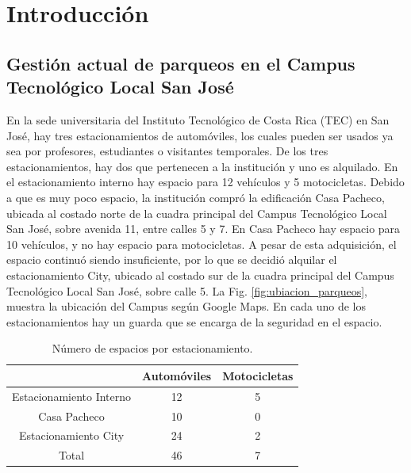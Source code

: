 \chapter{Introducción}
\label{chp:intro}

\section{Gestión actual de parqueos en el Campus Tecnológico Local San José}
En la sede universitaria del Instituto Tecnológico de Costa Rica (TEC) en San José, 
hay tres estacionamientos de automóviles, los cuales pueden ser usados ya sea por profesores,
estudiantes o visitantes temporales. De los tres estacionamientos, hay dos que pertenecen a la institución
y uno es alquilado. En el estacionamiento interno hay espacio para 12 vehículos y 5 motocicletas.
Debido a que es muy poco espacio, la institución compró la edificación Casa Pacheco, ubicada al costado norte
de la cuadra principal del Campus Tecnológico Local San José, sobre avenida 11, entre calles 5 y 7.
En Casa Pacheco hay espacio para 10 vehículos, y no hay espacio para motocicletas. A pesar de esta adquisición,
el espacio continuó siendo insuficiente, por lo que se decidió alquilar el estacionamiento City, ubicado al costado sur
de la cuadra principal del Campus Tecnológico Local San José, sobre calle 5. La Fig. \ref{fig:ubiacion_parqueos},
muestra la ubicación del Campus según Google Maps.
En cada uno de los estacionamientos hay un guarda que se encarga de la seguridad en el espacio.

\begin{table}[H]
	\centering
	\begin{tabular}{| c | c | c |}
		\hline
								& Automóviles & Motocicletas \\
		\hline
		Estacionamiento Interno & 12 		  & 5			 \\
		\hline
		Casa Pacheco			& 10		  & 0			 \\
		\hline
		Estacionamiento City	& 24		  & 2			 \\
		\hline
		Total					& 46		  & 7			 \\
		\hline
	\end{tabular}
	\caption{Número de espacios por estacionamiento.}
	\label{tab:numero_espacios}
\end{table}

